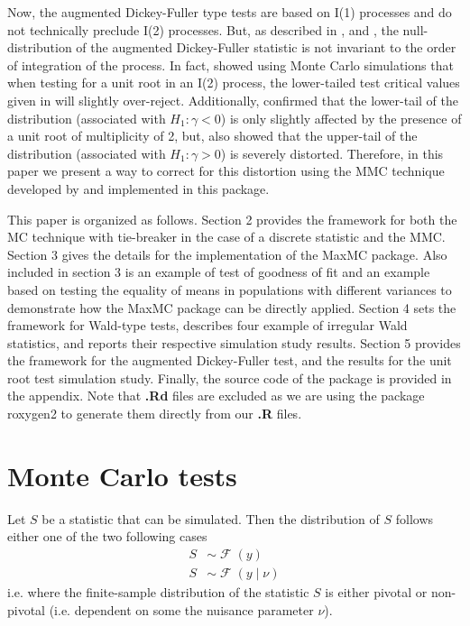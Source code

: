 \documentclass[]{article}\usepackage[]{graphicx}\usepackage[]{color}
\newcommand{\pkg}[1]{{\normalfont\fontseries{b}\selectfont #1}}
\DeclareMathOperator{\dist}{\mathcal{F}}
\begin{document}
Now, the augmented Dickey-Fuller type tests are based on I(1) processes and do not technically preclude I(2) processes. But, as described in \cite{david_a._dickey_determining_1987}, \cite{haldrup_robustness_2002} and \cite{pantula_testing_1989}, the null-distribution of the augmented Dickey-Fuller statistic is not invariant to the order of integration of the process. In fact, \cite{david_a._dickey_determining_1987} showed using Monte Carlo simulations that when testing for a unit root in an I(2) process, the lower-tailed test critical values given in \cite[Table 8.5.2]{fuller_introduction_1976} will slightly over-reject. Additionally,  \cite{haldrup_robustness_2002} confirmed that the lower-tail of the distribution (associated with $H_1: \gamma<0$) is only slightly affected by the presence of a unit root of multiplicity of 2, but, \cite{haldrup_robustness_2002} also showed that the upper-tail of the distribution (associated with $H_1: \gamma>0$) is severely distorted. Therefore, in this paper we present a way to correct for this distortion using the MMC technique developed by \cite{dufour_monte_2006} and implemented in this package.

This paper is organized as follows. Section 2 provides the framework for both the MC technique with tie-breaker in the case of a discrete statistic and the MMC. Section 3 gives the details for the implementation of the \pkg{MaxMC} package. Also included in section 3 is an example of test of goodness of fit and an example based on testing the equality of means in populations with different variances to demonstrate how the \pkg{MaxMC} package can be directly applied. Section 4 sets the framework for Wald-type tests, describes four example of irregular Wald statistics, and reports their respective simulation study results. Section 5 provides the framework for the augmented Dickey-Fuller test, and the results for the unit root test simulation study. Finally, the source code of the package is provided in the appendix. Note that \textbf{.Rd} files are excluded as we are using the package \pkg{roxygen2} \citep{wickham_roxygen2:_2015} to generate them directly from our \textbf{.R} files.

\section{Monte Carlo tests}

Let $S$ be a statistic that can be simulated. Then the distribution of $S$ follows either one of the two following cases
\begin{align}
S & \sim \dist(y) \\
S & \sim \dist(y \mid \nu)
\end{align}
i.e. where the finite-sample distribution of the statistic $S$ is either pivotal or non-pivotal (i.e. dependent on some the nuisance parameter $\nu$).
\end{document}
